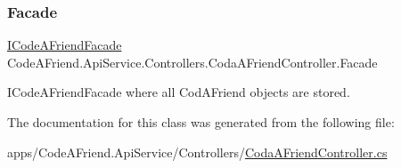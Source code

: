 \subsubsection{\texorpdfstring{Facade}{Facade}}
{\footnotesize\ttfamily \mbox{\hyperlink{interface_code_a_friend_1_1_facade_1_1_i_code_a_friend_facade}{I\+Code\+A\+Friend\+Facade}} Code\+A\+Friend.\+Api\+Service.\+Controllers.\+Coda\+A\+Friend\+Controller.\+Facade\hspace{0.3cm}{\ttfamily [protected]}}



I\+Code\+A\+Friend\+Facade where all Cod\+A\+Friend objects are stored. 



The documentation for this class was generated from the following file\+:\begin{DoxyCompactItemize}
\item 
apps/\+Code\+A\+Friend.\+Api\+Service/\+Controllers/\mbox{\hyperlink{_coda_a_friend_controller_8cs}{Coda\+A\+Friend\+Controller.\+cs}}\end{DoxyCompactItemize}
